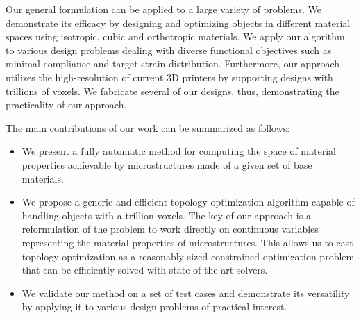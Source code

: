 Our general formulation can be applied to a large variety of problems. We demonstrate its efficacy by designing and optimizing objects in different material spaces using isotropic, cubic and orthotropic materials. We apply our algorithm to various design problems dealing with diverse functional objectives such as minimal compliance and target strain distribution. Furthermore, our approach utilizes the high-resolution of current 3D printers by supporting designs with trillions of voxels. We fabricate several of our designs, thus, demonstrating the practicality of our approach.

The main contributions of our work can be summarized as follows:
\begin{itemize}
	\item We present a fully automatic method for computing the space of material properties achievable by microstructures made of a given set of base materials.
	\item We propose a generic and efficient topology optimization algorithm capable of handling objects with a trillion voxels. The key of our approach is a reformulation of the problem to work directly on continuous variables representing the material properties of microstructures. This allows us to cast topology optimization as a reasonably sized constrained optimization problem that can be efficiently solved with state of the art solvers.
	\item We validate our method on a set of test cases and demonstrate its versatility by applying it to various design problems of practical interest.
\end{itemize}
